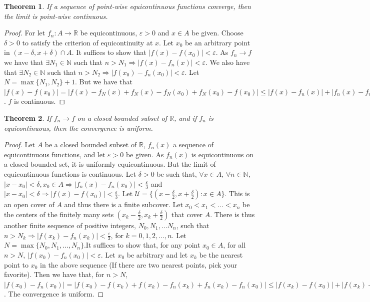 \documentclass[oneside]{book}
\theoremstyle{mystyle}
\newtheorem{theorem}{Theorem}[section]
\begin{document}
\begin{theorem} If a sequence of point-wise equicontinuous functions converge, then the limit is point-wise continuous.
\end{theorem}
\begin{proof}
For let $f_n:A\rightarrow \mathbb{R}$ be equicontinuous, $\varepsilon>0$ and $x\in A$ be given. Choose $\delta>0$ to satisfy the criterion of equicontinuity at $x$. Let $x_0$ be an arbitrary point in $(x-\delta,x+\delta)\cap A$. It suffices to show that $|f(x) - f(x_0)|<\varepsilon$. As $f_n \rightarrow f$ we have that $\exists N_1 \in\mathbb{N}$ such that $n>N_1\Rightarrow |f(x) - f_n(x)|<\varepsilon$. We also have that $\exists N_2 \in \mathbb{N}$ such that $n>N_2 \Rightarrow |f(x_0)-f_n(x_0)|<\varepsilon$. Let $N=\max\{N_1,N_2\}+1$. But we have that $|f(x) - f(x_0)| = |f(x) - f_N(x) + f_N(x)-f_N(x_0) + f_N(x_0) - f(x_0)|\leq |f(x) - f_n(x)| + |f_n(x)-f_n(x_0)| + |f_n(x_0) - f(x_0)| < 3\varepsilon$. $f$ is continuous.
\end{proof}

\begin{theorem}
If $f_n \rightarrow f$ on a closed bounded subset of $\mathbb{R}$, and if $f_n$ is equicontinuous, then the convergence is uniform.
\end{theorem}
\begin{proof}
Let $A$ be a closed bounded subset of $\mathbb{R}$, $f_n(x)$ a sequence of equicontinuous functions, and let $\varepsilon>0$ be given. As $f_n(x)$ is equicontinuous on a closed bounded set, it is uniformly equicontinuous. But the limit of equicontinuous functions is continuous. Let $\delta>0$ be such that, $\forall x\in A$, $\forall n\in\mathbb{N}$, $|x-x_0|<\delta, x_0\in A \Rightarrow |f_n(x)-f_n(x_0)|<\frac{\varepsilon}{3}$ and $|x-x_0|<\delta \Rightarrow |f(x)-f(x_0)|<\frac{\varepsilon}{3}$. Let $\mathcal{U} = \{(x-\frac{\delta}{2},x+\frac{\delta}{2}): x\in A\}$. This is an open cover of $A$ and thus there is a finite subcover. Let $x_0<x_1<\hdots<x_n$ be the centers of the finitely many sets $(x_k-\frac{\delta}{2},x_k+\frac{\delta}{2})$ that cover $A$. There is thus another finite sequence of positive integers, $N_0, N_1,... N_n$, such that $n>N_k \Rightarrow |f(x_k)-f_n(x_k)|<\frac{\varepsilon}{3}$, for $k=0,1,2,...,n$. Let $N= \max\{N_0, N_1, ..., N_n\}$.It suffices to show that, for any point $x_0 \in A$, for all $n>N$, $|f(x_0)-f_n(x_0)|<\varepsilon$. Let $x_0$ be arbitrary and let $x_k$ be the nearest point to $x_0$ in the above sequence (If there are two nearest points, pick your favorite). Then we have that, for $n>N$, $|f(x_0) - f_n(x_0)| = |f(x_0)-f(x_k)+f(x_k)-f_n(x_k)+f_n(x_k)-f_n(x_0)|\leq |f(x_k)-f(x_0)|+|f(x_k)-f_n(x_k)|+|f_n(x_k)-f_n(x_0)|<\varepsilon$. The convergence is uniform.
\end{proof}
\end{document}
